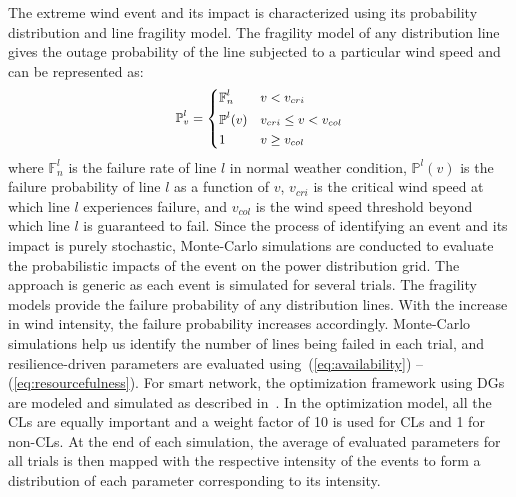 The extreme wind event and its impact is characterized using its probability distribution and line fragility model. The fragility model of any distribution line gives the outage probability of the line subjected to a particular wind speed and can be represented as:
\vspace{-5pt}
\begin{equation} \small 
\begin{aligned}
&\mathbb{P}_v^l= \begin{dcases}\mathbb{F}_n^l & v < v_{cri} \\
\mathbb{P}^l (v)  & v_{cri} \leq v < v_{col} \\
1 & v \geq v_{col} 
\end{dcases} \\
\end{aligned}
\label{eq:outage}
\vspace{-3pt}
\end{equation}
where $\mathbb{F}_n^l$ is the failure rate of line $l$ in normal weather condition, $\mathbb{P}^l (v)$ is the failure probability of line $l$ as a function of $v$, $v_{cri}$ is the critical wind speed at which line $l$ experiences failure, and $v_{col}$ is the wind speed threshold beyond which line $l$ is guaranteed to fail. Since the process of identifying an event and its impact is purely stochastic, Monte-Carlo simulations are conducted to evaluate the probabilistic impacts of the event on the power distribution grid. The approach is generic as each event is simulated for several trials. The fragility models provide the failure probability of any distribution lines. With the increase in wind intensity, the failure probability increases accordingly. Monte-Carlo simulations help us identify the number of lines being failed in each trial, and resilience-driven parameters are evaluated using~(\ref{eq:availability}) -- (\ref{eq:resourcefulness}). For smart network, the optimization framework using DGs are modeled and simulated as described in~\cite{poudel2018critical}. In the optimization model, all the CLs are equally important and a weight factor of 10 is used for CLs and 1 for non-CLs. At the end of each simulation, the average of evaluated parameters for all trials is then mapped with the respective intensity of the events to form a distribution of each parameter corresponding to its intensity. 

